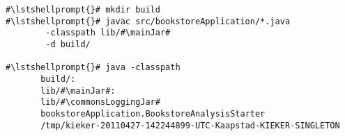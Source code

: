 \begin{lstlisting}[caption=Commands to compile and run the analysis under \UnixLikeSystems{},label=lst:bookstoreAnalysisStarterLinux] 			
#\lstshellprompt{}# mkdir build
#\lstshellprompt{}# javac src/bookstoreApplication/*.java
        -classpath lib/#\mainJar#
        -d build/

#\lstshellprompt{}# java -classpath
       build/:
       lib/#\mainJar#:
       lib/#\commonsLoggingJar#
       bookstoreApplication.BookstoreAnalysisStarter 
       /tmp/kieker-20110427-142244899-UTC-Kaapstad-KIEKER-SINGLETON
\end{lstlisting}	
